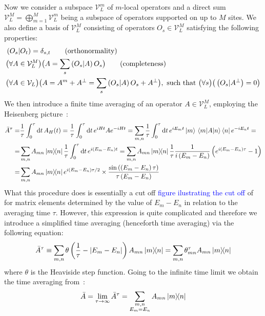   Now we consider a subspace \(\mathcal{V}_L^m\) of \(m\)-local operators and a direct sum 
  \(\mathcal{V}_L^M = \bigoplus_{m = 1}^M \mathcal{V}_L^m\) being a subspace of operators supported on up to \(M\) sites.
  We also define a basis of \(\mathcal{V}_L^M\) consisting of operators \(O_s\in \mathcal{V}_L^M\)
  satisfying the following properties:
  \begin{align*}
    & \hs{O_s}{O_{t}} = \delta_{s,t} \tag{\text{orthonormality}}\\
    & \big(\forall A \in \mathcal{V}_L^M\big) \big(A = \sum_s \hs{O_s}{A} O_s\big) \tag{\text{completeness}}\\
    & \big(\forall A \in \mathcal{V}_L \big) \big( A = A^m + A^{\perp} = \sum_s \hs{O_s}{A} O_s + A^{\perp}\big) ,
     \text{ such that } \big(\forall s\big) \big( \hs{O_s}{A^{\perp}} = 0\big) 
  \end{align*}
  We then introduce a finite time averaging of an operator \(A\in \mathcal{V}_L^M\), employing the Heisenberg picture~\autocite{Mierzejewski2015Approx}:
  \begin{align}
    \bar{A}^{\tau} = &\frac{1}{\tau} \int_0^{\tau} \mathrm{d}t\, A_{H}(t) = \frac{1}{\tau} \int_0^{\tau} \mathrm{d}t\, e^{i H t}A e^{-i H t}   
    =\sum_{m,n} \frac{1}{\tau} \int_0^{\tau} \mathrm{d}t\, e^{i E_m t}\ket{m} \matrixel{m}{A}{n}\bra{n}  e^{-i E_n t} = \nonumber\\ 
     =&\sum_{m,n} A_{mn}\ketbra{m}{n} \frac{1}{\tau} \int_0^{\tau} \mathrm{d}t \, e^{i(E_m-E_n)t} =
    \sum_{m,n} A_{mn}\ketbra{m}{n} \frac{1}{\tau} \frac{1}{i\left(E_m-E_n\right)}\left(e^{i\left(E_m-E_n\right)\tau}-1\right) \nonumber \\
    =& \sum_{m,n} A_{mn}\ketbra{m}{n} 
    e^{i\left(E_m-E_n\right)\tau/2}\times \frac{\sin{\left(\left(E_m-E_n\right)\tau\right)}}{\tau\left(E_m-E_n\right)}
    \label{eq:time_avg}
  \end{align}
  What this procedure does is essentially a cut off \textcolor{blue}{figure ilustrating the cut off} of for matrix elements determined by the value of \(E_m-E_n\) in relation
  to the averaging time \(\tau\). However, this expression is quite complicated and therefore we introduce a simplified time
  averaging (henceforth time averaging) via the following equation:
  \begin{equation}
    \bar{A}^{\tau} \equiv \sum_{m,n} \theta\left(\frac{1}{\tau} - \abs{E_m-E_n}\right) A_{mn} \ketbra{m}{n} 
    = \sum_{m,n} \theta_{mn}^{\tau} A_{mn} \ketbra{m}{n}
    \label{eq:simple time avg}
  \end{equation}
where \(\theta\) is the Heaviside step function. Going to the infinite time limit we obtain the time averaging 
from~\textcite{Mierzejewski2015a}:
\begin{equation}
  \bar{A} = \lim_{\tau \to \infty} \bar{A}^{\tau} = \sum_{ \substack{m,n\\E_m=E_n} } A_{mn} \ketbra{m}{n}
  \label{eq:inf time avg}
\end{equation}

